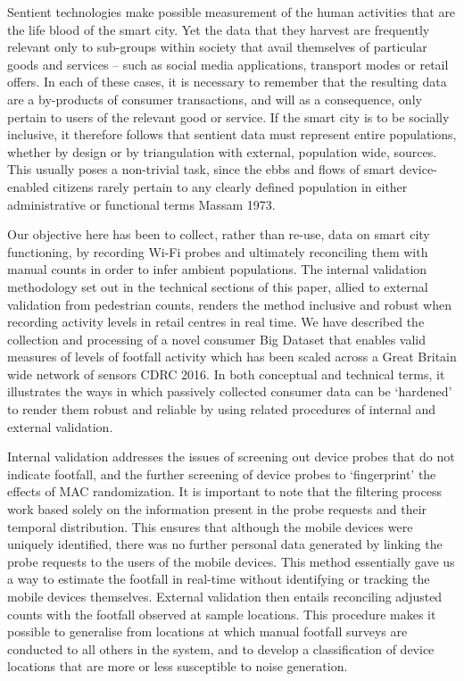 Sentient technologies make possible measurement of the human activities that are
the life blood of the smart city. Yet the data that they harvest are frequently
relevant only to sub-groups within society that avail themselves of particular
goods and services – such as social media applications, transport modes or
retail offers. In each of these cases, it is necessary to remember that the
resulting data are a by-products of consumer transactions, and will as a
consequence, only pertain to users of the relevant good or service. If the smart
city is to be socially inclusive, it therefore follows that sentient data must
represent entire populations, whether by design or by triangulation with
external, population wide, sources. This usually poses a non-trivial task, since
the ebbs and flows of smart device-enabled citizens rarely pertain to any
clearly defined population in either administrative or functional terms Massam
1973.

Our objective here has been to collect, rather than re-use, data on smart city
functioning, by recording Wi-Fi probes and ultimately reconciling them with
manual counts in order to infer ambient populations. The internal validation
methodology set out in the technical sections of this paper, allied to external
validation from pedestrian counts, renders the method inclusive and robust when
recording activity levels in retail centres in real time. We have described the
collection and processing of a novel consumer Big Dataset that enables valid
measures of levels of footfall activity which has been scaled across a Great
Britain wide network of sensors CDRC 2016.  In both conceptual and technical
terms, it illustrates the ways in which passively collected consumer data can be
‘hardened’ to render them robust and reliable by using related procedures of
internal and external validation.

Internal validation addresses the issues of screening out device probes that do
not indicate footfall, and the further screening of device probes to
‘fingerprint’ the effects of MAC randomization. It is important to note that the
filtering process work based solely on the information present in the probe
requests and their temporal distribution. This ensures that although the mobile
devices were uniquely identified, there was no further personal data generated
by linking the probe requests to the users of the mobile devices. This method
essentially gave us a way to estimate the footfall in real-time without
identifying or tracking the mobile devices themselves. External validation then
entails reconciling adjusted counts with the footfall observed at sample
locations. This procedure makes it possible to generalise from locations at
which manual footfall surveys are conducted to all others in the system, and to
develop a classification of device locations that are more or less susceptible
to noise generation.

